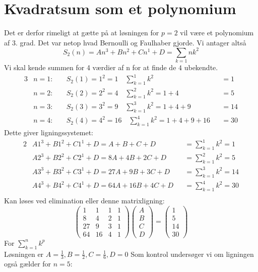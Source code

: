 \section{Kvadratsum som et polynomium}
Det er derfor rimeligt at gætte på at løsningen for \(p=2\) vil være et polynomium af 3. grad. Det var netop hvad Bernoulli og Faulhaber gjorde.
Vi antager altså
\[S_{2}(n)=An^3+Bn^2+Cn^1+D=\sum_{k=1}{n}k^2\]
Vi skal kende summen for 4 værdier af n for at finde de \(4\) ubekendte. 
\begin{alignat*}{3}
&n=1: \quad &S_{2}(1)=1^2=1 \quad \sum_{k=1}^{1}k^2&&=1\\
&n=2: \quad &S_{2}(2)=2^2=4 \quad \sum_{k=1}^{2}k^2=1+4&&=5\\
&n=3: \quad &S_{2}(3)=3^2=9 \quad \sum_{k=1}^{3}k^2=1+4+9&&=14\\
&n=4: \quad &S_{2}(4)=4^2=16 \quad \sum_{k=1}^{4}k^2=1+4+9+16&&=30
\end{alignat*}
Dette giver ligningssystemet:
\begin{alignat*}{2}
&A1^3+B1^2+C1^1+D=A+B+C+D&&=\sum_{k=1}^{1}k^2=1\\
&A2^3+B2^2+C2^1+D=8A+4B+2C+D&&=\sum_{k=1}^{2}k^2=5\\
&A3^3+B3^2+C3^1+D=27A+9B+3C+D&&=\sum_{k=1}^{3}k^2=14\\
&A4^3+B4^2+C4^1+D=64A+16B+4C+D&&=\sum_{k=1}^{4}k^2=30\\
\end{alignat*}
Kan løses ved elimination eller denne matrixligning:
\begin{equation}
\begin{pmatrix}
1&1&1&1\\
8&4&2&1\\
27&9&3&1\\
64&16&4&1
\end{pmatrix}
\begin{pmatrix} A\\B\\C\\D \end{pmatrix} =\begin{pmatrix} 1\\5\\14\\30 \end{pmatrix}
\end{equation}
For \(\sum_{k=1}^{n}k^p\)\\
Løsningen er \(A=\frac{1}{3}, B=\frac{1}{2}, C=\frac{1}{6}, D=0\)
Som kontrol undersøger vi om ligningen også gælder for \(n=5:\)
